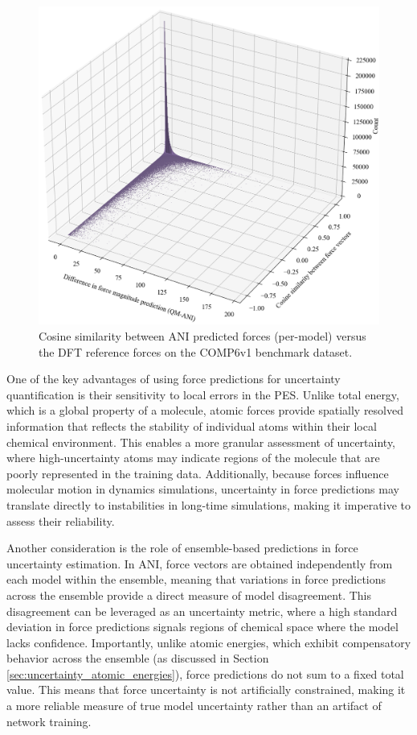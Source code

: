 \begin{figure}[H]
    \centering
    \includegraphics[width=1\linewidth]{Images/2xr_forces/2xr_comp6v1_force-cosine_sim-bar3d.png}
    \caption[Per-model cosine similarity measure of predicted atomic force vectors]{
    Cosine similarity between ANI predicted forces (per-model) versus the DFT reference forces on the COMP6v1 benchmark dataset.
    }
    \label{fig:2xr_comp6v1-forces-cos_sim}
\end{figure}

One of the key advantages of using force predictions for uncertainty quantification is their sensitivity to local errors in the PES. Unlike total energy, which is a global property of a molecule, atomic forces provide spatially resolved information that reflects the stability of individual atoms within their local chemical environment. This enables a more granular assessment of uncertainty, where high-uncertainty atoms may indicate regions of the molecule that are poorly represented in the training data. Additionally, because forces influence molecular motion in dynamics simulations, uncertainty in force predictions may translate directly to instabilities in long-time simulations, making it imperative to assess their reliability.

Another consideration is the role of ensemble-based predictions in force uncertainty estimation. In ANI, force vectors are obtained independently from each model within the ensemble, meaning that variations in force predictions across the ensemble provide a direct measure of model disagreement. This disagreement can be leveraged as an uncertainty metric, where a high standard deviation in force predictions signals regions of chemical space where the model lacks confidence. Importantly, unlike atomic energies, which exhibit compensatory behavior across the ensemble (as discussed in Section \ref{sec:uncertainty_atomic_energies}), force predictions do not sum to a fixed total value. This means that force uncertainty is not artificially constrained, making it a more reliable measure of true model uncertainty rather than an artifact of network training.

